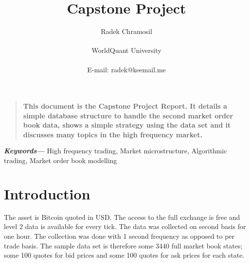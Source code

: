 \documentclass[12pt]{article}
\title{Capstone Project}
\author
{Radek Chramosil\\
\\
\normalsize{WorldQuant University}\\
\\
\normalsize{E-mail:  radek@keemail.me}
}
\date{}
\newenvironment{sciabstract}{%
\begin{quote} \bf}
{\end{quote}}
\providecommand{\keywords}[1]
{
  \small	
  \textbf{\textit{Keywords---}} #1
}
\begin{document}
 


\baselineskip24pt


\maketitle 




\begin{sciabstract}
This document is the Capstone Project Report. It details a simple database structure to handle the second market order book data, shows a simple strategy using the data set and it discusses many topics in the high frequency market.
\end{sciabstract}

\keywords{High frequency trading, Market microstructure, Algorithmic trading, Market order book modelling}



\section*{Introduction}
The asset is Bitcoin quoted in USD. The access to the full exchange is free and level 2 data is available for every tick. The data was collected on second basis for one hour. The collection was done with 1 second frequency as opposed to per trade basis. The sample data set is therefore some 3440 full market book states; some 100 quotes for bid prices and some 100 quotes for ask prices for each state.
\end{document}
